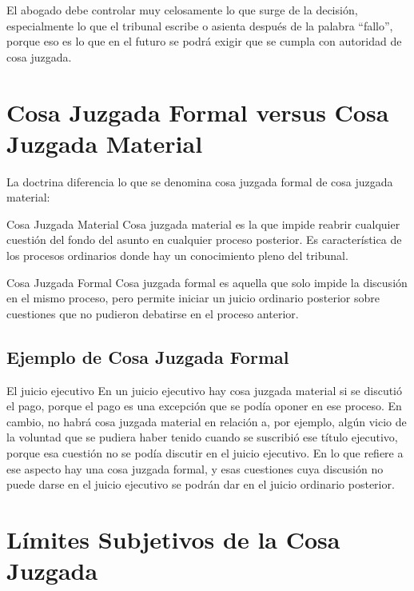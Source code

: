 \documentclass[12pt,oneside]{book}
\begin{document}
El abogado debe controlar muy celosamente lo que surge de la decisión, especialmente lo que el tribunal escribe o asienta después de la palabra ``fallo'', porque eso es lo que en el futuro se podrá exigir que se cumpla con autoridad de cosa juzgada.

\section{Cosa Juzgada Formal versus Cosa Juzgada Material}

La doctrina diferencia lo que se denomina cosa juzgada formal de cosa juzgada material:

\begin{definition}{Cosa Juzgada Material}
Cosa juzgada material es la que impide reabrir cualquier cuestión del fondo del asunto en cualquier proceso posterior. Es característica de los procesos ordinarios donde hay un conocimiento pleno del tribunal.
\end{definition}

\begin{definition}{Cosa Juzgada Formal}
Cosa juzgada formal es aquella que solo impide la discusión en el mismo proceso, pero permite iniciar un juicio ordinario posterior sobre cuestiones que no pudieron debatirse en el proceso anterior.
\end{definition}

\subsection{Ejemplo de Cosa Juzgada Formal}

\begin{example}{El juicio ejecutivo}
En un juicio ejecutivo hay cosa juzgada material si se discutió el pago, porque el pago es una excepción que se podía oponer en ese proceso. En cambio, no habrá cosa juzgada material en relación a, por ejemplo, algún vicio de la voluntad que se pudiera haber tenido cuando se suscribió ese título ejecutivo, porque esa cuestión no se podía discutir en el juicio ejecutivo. En lo que refiere a ese aspecto hay una cosa juzgada formal, y esas cuestiones cuya discusión no puede darse en el juicio ejecutivo se podrán dar en el juicio ordinario posterior.
\end{example}

\section{Límites Subjetivos de la Cosa Juzgada}
\end{document}
